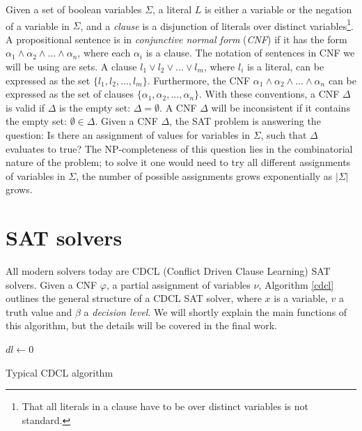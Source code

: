 \documentclass[12pt]{diicc}
\begin{document}
Given a set of boolean variables $\Sigma$, a literal $L$ is either a variable or the negation of a variable in $\Sigma$, and a \textit{clause} is a disjunction of literals over distinct variables\footnote[1]{That all literals in a clause have to be over distinct variables is not standard.}. A propositional sentence is in \textit{conjunctive normal form} (\textit{CNF}) if it has the form $\alpha_{1} \wedge \alpha_{2} \wedge ... \wedge \alpha_{n}$, where each $\alpha_{i}$ is a clause. The notation of sentences in CNF we will be using are sets. A clause $l_{1} \vee l_{2} \vee ... \vee l_{m}$, where $l_{i}$ is a literal, can be expressed as the set $\{l_{1},l_{2},...,l_{m}\}$. Furthermore, the CNF $\alpha_{1} \wedge \alpha_{2} \wedge ... \wedge \alpha_{n}$ can be expressed as the set of clauses $\{\alpha_{1},\alpha_{2},...,\alpha_{n}\}$. With these conventions, a CNF $\Delta$ is valid if $\Delta$ is the empty set: $\Delta = \emptyset$. A CNF $\Delta$ will be inconsistent if it contains the empty set: $\emptyset \in \Delta$. 
Given a CNF $\Delta$, the SAT problem is answering the question: Is there an assignment of values for variables in $\Sigma$, such that $\Delta$ evaluates to true? The NP-completeness of this question lies in the combinatorial nature of the problem; to solve it one would need to try all different assignments of variables in $\Sigma$, the number of possible assignments grows exponentially as $|\Sigma|$ grows.

\section{SAT solvers}

All modern solvers today are CDCL (Conflict Driven Clause Learning) \cite{cdcl} SAT solvers. Given a CNF $\varphi$, a partial assignment of variables $\nu$, Algorithm \ref{cdcl} outlines the general structure of a CDCL SAT solver, where $x$ is a variable, $v$ a truth value and $\beta$ a \textit{decision level}. We will shortly explain the main functions of this algorithm, but the details will be covered in the final work.

\begin{algorithm}
$dl \leftarrow 0$\\
\caption{Typical CDCL algorithm\label{cdcl}}
\end{algorithm}
\end{document}
